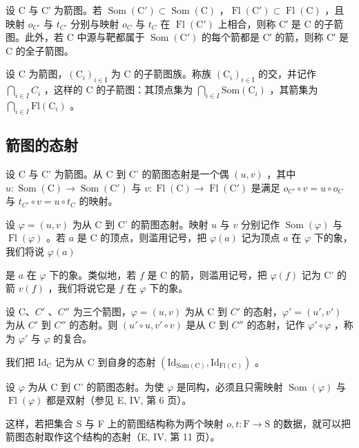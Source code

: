 设 C 与 C′ 为箭图。若 \(\operatorname{Som}(\mathrm{C}') \subset \operatorname{Som}(\mathrm{C})\) ，\(\operatorname{Fl}(\mathrm{C}') \subset \operatorname{Fl}(\mathrm{C})\) ，且映射 \(o_{C'}\) 与 \(t_{C'}\) 分别与映射 \(o_{C}\) 与 \(t_{C}\) 在 \(\operatorname{Fl}(\mathrm{C}')\) 上相合，则称 C′ 是 C 的子箭图。此外，若 C 中源与靶都属于 \(\operatorname{Som}(\mathrm{C}')\) 的每个箭都是 C′ 的箭，则称 C′ 是 C 的全子箭图。

设 C 为箭图，\((\mathrm{C}_{i})_{i\in\mathrm{I}}\) 为 C 的子箭图族。称族 \((\mathrm{C}_{i})_{i\in\mathrm{I}}\) 的交，并记作 \(\bigcap_{i\in I}C_{i}\) ，这样的 C 的子箭图：其顶点集为 \(\bigcap_{i\in I}\mathrm{Som}(\mathrm{C}_{i})\) ，其箭集为 \(\bigcap_{i\in I}\mathrm{Fl}(\mathrm{C}_{i})\) 。

\subsection{箭图的态射}

设 C 与 C' 为箭图。从 C 到 C' 的箭图态射是一个偶 \((u,v)\) ，其中 \(u\colon\operatorname{Som}(\mathrm{C})\to\operatorname{Som}(\mathrm{C}')\) 与 \(v\colon\operatorname{Fl}(\mathrm{C})\to\operatorname{Fl}(\mathrm{C}')\) 是满足 \(o_{C'}\circ v=u\circ o_{C}\) 与 \(t_{C'}\circ v=u\circ t_{C}\) 的映射。

设 \(\varphi = (u, v)\) 为从 C 到 C' 的箭图态射。映射 \(u\) 与 \(v\) 分别记作 \(\operatorname{Som}(\varphi)\) 与 \(\operatorname{Fl}(\varphi)\) 。若 \(a\) 是 C 的顶点，则滥用记号，把 \(\varphi(a)\) 记为顶点 \(a\) 在 \(\varphi\) 下的象，我们将说 \(\varphi(a)\)

是 \(a\) 在 \(\varphi\) 下的象。类似地，若 \(f\) 是 C 的箭，则滥用记号，把 \(\varphi(f)\) 记为 C' 的箭 \(v(f)\) ，我们将说它是 \(f\) 在 \(\varphi\) 下的象。

设 C、\(C'\) 、\(C''\) 为三个箭图，\(\varphi = (u, v)\) 为从 C 到 \(C'\) 的态射，\(\varphi' = (u', v')\) 为从 \(C'\) 到 \(C''\) 的态射。则 \((u' \circ u, v' \circ v)\) 是从 C 到 \(C''\) 的态射，记作 \(\varphi' \circ \varphi\) ，称为 \(\varphi'\) 与 \(\varphi\) 的复合。

我们把 \(\mathrm{Id}_{\mathrm{C}}\) 记为从 C 到自身的态射 \((\mathrm{Id}_{\mathrm{Som}(\mathrm{C})}, \mathrm{Id}_{\mathrm{Fl}(\mathrm{C})})\) 。

设 \(\varphi\) 为从 C 到 C' 的箭图态射。为使 \(\varphi\) 是同构，必须且只需映射 \(\operatorname{Som}(\varphi)\) 与 \(\operatorname{Fl}(\varphi)\) 都是双射（参见 E, IV, 第 6 页）。

这样，若把集合 S 与 F 上的箭图结构称为两个映射 \(o, t: \mathrm{F} \to \mathrm{S}\) 的数据，就可以把箭图态射取作这个结构的态射（E, IV, 第 11 页）。

